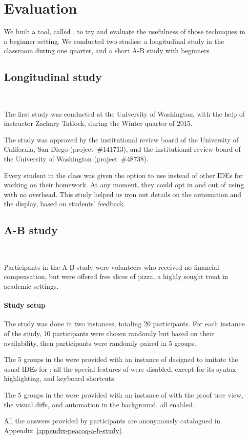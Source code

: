 \section{Evaluation}

We built a tool, called \PeaCoq{}, to try and evaluate the usefulness of those
techniques in a beginner setting.  We conducted two studies: a longitudinal
study in the classroom during one quarter, and a short A-B study with beginners.

\subsection{Longitudinal study}~\label{peacoq-longitudinal-study}

The first study was conducted at the University of Washington, with the help of
instructor Zachary Tatlock, during the Winter quarter of 2015.

The study was approved by the institutional review board of the University of
California, San Diego (project~\#141713), and the institutional review board of
the University of Washington (project~\#48738).

Every student in the class was given the option to use \PeaCoq{} instead of
other IDEs for working on their homework.  At any moment, they could opt in and
out of using \PeaCoq{} with no overhead.  This study helped us iron out details
on the automation and the display, based on students' feedback.


\subsection{A-B study}~\label{peacoq-a-b-study}

Participants in the A-B study were volunteers who received no financial
compensation, but were offered free slices of pizza, a highly sought treat in
academic settings.

\paragraph{Study setup}

The study was done in two instances, totaling 20 participants.  For each
instance of the study, 10 participants were chosen randomly but based on their
availability, then participants were randomly paired in 5 groups.

The 5 groups in the  were provided with an instance of
\PeaCoq{} designed to imitate the usual IDEs for \Coq{}: all the special
features of \PeaCoq{} were disabled, except for its syntax highlighting, and
keyboard shortcuts.

The 5 groups in the  were provided with an instance of
\PeaCoq{} with the proof tree view, the visual diffs, and automation in the
background, all enabled.

All the answers provided by participants are anonymously catalogued
in Appendix~\ref{appendix-peacoq-a-b-study}.

